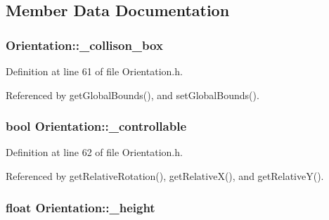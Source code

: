 \subsection{Member Data Documentation}
\hypertarget{classOrientation_a92030f5994ff171542a5b6e5b104f2f1}{
\subsubsection[{\-\_\-collison\-\_\-box}]{ Orientation\-::\-\_\-collison\-\_\-box\hspace{0.3cm}{\ttfamily [private]}}}\label{classOrientation_a92030f5994ff171542a5b6e5b104f2f1}


Definition at line 61 of file Orientation.\-h.



Referenced by get\-Global\-Bounds(), and set\-Global\-Bounds().

\hypertarget{classOrientation_ab8577b28d6c1e445d55d113640f1ed07}{
\subsubsection[{\-\_\-controllable}]{\setlength{\rightskip}{0pt plus 5cm}bool Orientation\-::\-\_\-controllable\hspace{0.3cm}{\ttfamily [private]}}}\label{classOrientation_ab8577b28d6c1e445d55d113640f1ed07}


Definition at line 62 of file Orientation.\-h.



Referenced by get\-Relative\-Rotation(), get\-Relative\-X(), and get\-Relative\-Y().

\hypertarget{classOrientation_adf3f5a166d15ee16f99612bc5c6ef080}{
\subsubsection[{\-\_\-height}]{\setlength{\rightskip}{0pt plus 5cm}float Orientation\-::\-\_\-height\hspace{0.3cm}{\ttfamily [private]}}}\label{classOrientation_adf3f5a166d15ee16f99612bc5c6ef080}


